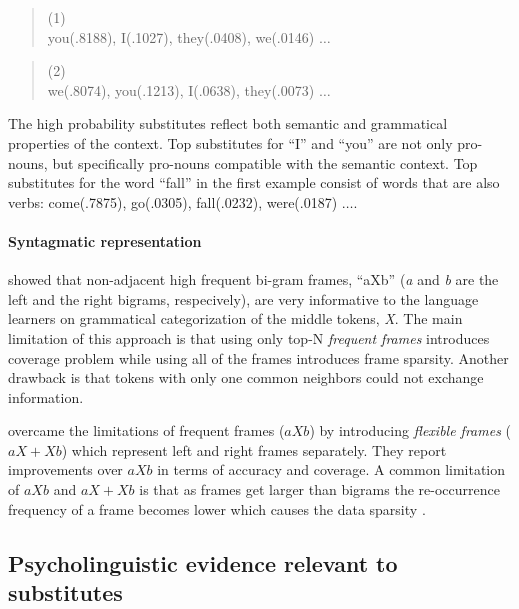 \begin{quote}
  \small
  (1) \\
   you(.8188), I(.1027), they(.0408), we(.0146) $\ldots$
\end{quote}

\begin{quote}
  \small
  (2) \\
   we(.8074), you(.1213), I(.0638), they(.0073) $\ldots$
\end{quote}

The high probability substitutes reflect both semantic and grammatical
properties of the context.  Top substitutes for ``I'' and ``you'' are not only
pro-nouns, but specifically pro-nouns compatible with the semantic context.
Top substitutes for the word ``fall'' in the first example consist of words
that are also verbs: come(.7875), go(.0305), fall(.0232), were(.0187) $\ldots$.


\paragraph {Syntagmatic representation} \cite{Mintz200391} showed that
non-adjacent high frequent bi-gram frames, ``aXb'' ({\it a} and {\it b} are the
left and the right bigrams, respecively), are very informative to the language
learners on grammatical categorization of the middle tokens, {\it X}.  The main
limitation of this approach is that using only top-N {\it frequent frames}
introduces coverage problem while using all of the frames introduces frame
sparsity.  Another drawback is that tokens with only one common neighbors could
not exchange information. 

\cite{clair2010} overcame the limitations of frequent frames ($aXb$) by
introducing {\it flexible frames} ($aX+Xb$) which represent left and right
frames separately.  They report improvements over $aXb$ in terms of accuracy
and coverage.  A common limitation of $aXb$ and $aX+Xb$ is that as frames get
larger than bigrams the re-occurrence frequency of a frame becomes lower which
causes the data sparsity \citep*{manning99foundations}.

\subsection{Psycholinguistic evidence relevant to substitutes}
